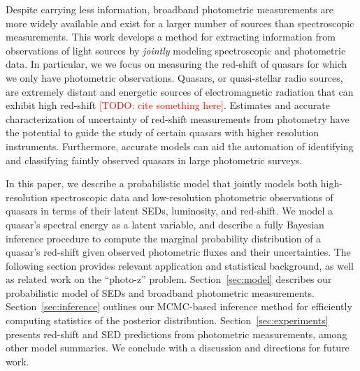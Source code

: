\documentclass{article}
\newcommand{\red}[1]{\textcolor{red}{[TODO: #1]}}
\begin{document}
Despite carrying less information, broadband photometric measurements are more widely available and exist for a larger number of sources than spectroscopic measurements. 
This work develops a method for extracting information from observations of light sources by \emph{jointly} modeling spectroscopic and photometric data.  
In particular, we we focus on measuring the red-shift of quasars for which we only have photometric observations.  
Quasars, or quasi-stellar radio sources, are extremely distant and energetic sources of electromagnetic radiation that can exhibit high red-shift \red{cite something here}.  
Estimates and accurate characterization of uncertainty of red-shift measurements from photometry have the potential to guide the study of certain quasars with higher resolution instruments.  
Furthermore, accurate models can aid the automation of identifying and classifying faintly observed quasars in large photometric surveys.  

In this paper, we describe a probabilistic model that jointly models both high-resolution spectroscopic data and low-resolution photometric observations of quasars in terms of their latent SEDs, luminosity, and red-shift.  We model a quasar's spectral energy as a latent variable, and describe a fully Bayesian inference procedure to compute the marginal probability distribution of a quasar's red-shift given observed photometric fluxes and their uncertainties.  The following section provides relevant application and statistical background, as well as related work on the ``photo-z'' problem.  Section~\ref{sec:model} describes our probabilistic model of SEDs and broadband photometric measurements.  Section~\ref{sec:inference} outlines our MCMC-based inference method for efficiently computing statistics of the posterior distribution. Section~\ref{sec:experiments} presents red-shift and SED predictions from photometric measurements, among other model summaries.  We conclude with a discussion and directions for future work.  
\end{document}
